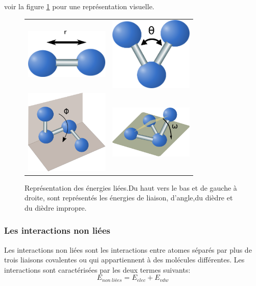 voir la figure \ref{graph:E_liees} pour une représentation visuelle.

   \begin{figure}[!htbp]
     \centering
     \begin{tabular}{cc}
       \includegraphics[width=4cm]{figure/liaison.png} &
       \includegraphics[width=4cm]{figure/angle.png} \\
       \includegraphics[width=4cm]{figure/dihedre.png} &
       \includegraphics[width=4cm]{figure/impropre.png} \\

     \end{tabular}
     
     \caption{Représentation des énergies liées.Du haut vers le bas et de gauche à droite, sont représentés les énergies de liaison, d'angle,du dièdre et du dièdre impropre.}
\label{graph:E_liees}
   \end{figure}



\subsubsection{Les interactions non liées}
Les interactions non liées sont les interactions entre atomes séparés par plus de trois liaisons covalentes ou qui appartiennent à des molécules différentes. Les interactions sont caractérisées par les deux termes suivants:
\begin{equation}
E_{non\ liées} = E_{elec} + E_{vdw}  
\end{equation}


